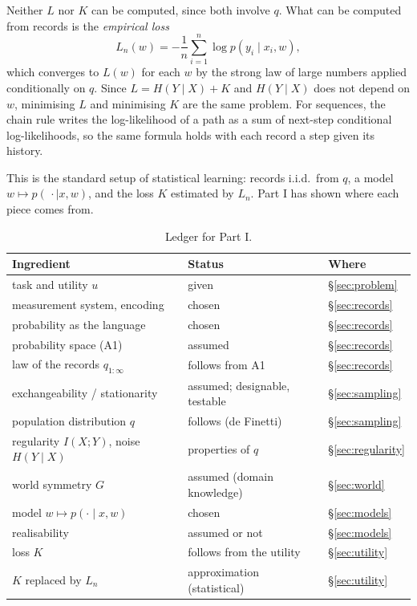\documentclass[11pt]{article}
\theoremstyle{definition}
\theoremstyle{plain}
\theoremstyle{remark}
\begin{document}
Neither $L$ nor $K$ can be computed, since both involve $q$. What can
be computed from records is the \emph{empirical loss}
\[
L_n(w) = -\frac1n \sum_{i=1}^n \log p(y_i\mid x_i,w),
\]
which converges to $L(w)$ for each $w$ by the strong law of large
numbers applied conditionally on $q$. Since $L = H(Y\mid X) + K$ and
$H(Y\mid X)$ does not depend on $w$, minimising $L$ and minimising $K$
are the same problem. For
sequences, the chain rule writes the log-likelihood of a path as a sum
of next-step conditional log-likelihoods, so the same formula holds
with each record a step given its history.

This is the standard setup of statistical learning: records i.i.d.\
from $q$, a model $w\mapsto p(\,\cdot\mid x,w)$, and the loss $K$
estimated by $L_n$. Part I has shown where each piece comes from.

\begin{table}[h]
\centering
\small
\begin{tabular}{@{}lll@{}}
\toprule
Ingredient & Status & Where \\
\midrule
task and utility $u$ & given & \S\ref{sec:problem} \\
measurement system, encoding & chosen & \S\ref{sec:records} \\
probability as the language & chosen & \S\ref{sec:records} \\
probability space (A1) & assumed & \S\ref{sec:records} \\
law of the records $q_{1:\infty}$ & follows from A1 & \S\ref{sec:records} \\
exchangeability / stationarity & assumed; designable, testable & \S\ref{sec:sampling} \\
population distribution $q$ & follows (de Finetti) & \S\ref{sec:sampling} \\
regularity $I(X;Y)$, noise $H(Y\mid X)$ & properties of $q$ & \S\ref{sec:regularity} \\
world symmetry $G$ & assumed (domain knowledge) & \S\ref{sec:world} \\
model $w\mapsto p(\cdot\mid x,w)$ & chosen & \S\ref{sec:models} \\
realisability & assumed or not & \S\ref{sec:models} \\
loss $K$ & follows from the utility & \S\ref{sec:utility} \\
$K$ replaced by $L_n$ & approximation (statistical) & \S\ref{sec:utility} \\
\bottomrule
\end{tabular}
\caption{Ledger for Part I.}
\end{table}
\end{document}
